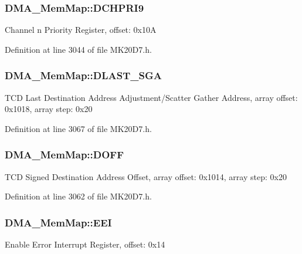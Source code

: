 \subsubsection[{\texorpdfstring{D\+C\+H\+P\+R\+I9}{DCHPRI9}}]{ D\+M\+A\+\_\+\+Mem\+Map\+::\+D\+C\+H\+P\+R\+I9}\hypertarget{struct_d_m_a___mem_map_a364959f468d1568b369d5a398ad30551}{}\label{struct_d_m_a___mem_map_a364959f468d1568b369d5a398ad30551}
Channel n Priority Register, offset\+: 0x10A 

Definition at line 3044 of file M\+K20\+D7.\+h.

\subsubsection[{\texorpdfstring{D\+L\+A\+S\+T\+\_\+\+S\+GA}{DLAST_SGA}}]{ D\+M\+A\+\_\+\+Mem\+Map\+::\+D\+L\+A\+S\+T\+\_\+\+S\+GA}\hypertarget{struct_d_m_a___mem_map_ace5b1452402cb8cd1863c10b0b8dc8bc}{}\label{struct_d_m_a___mem_map_ace5b1452402cb8cd1863c10b0b8dc8bc}
T\+CD Last Destination Address Adjustment/\+Scatter Gather Address, array offset\+: 0x1018, array step\+: 0x20 

Definition at line 3067 of file M\+K20\+D7.\+h.

\subsubsection[{\texorpdfstring{D\+O\+FF}{DOFF}}]{ D\+M\+A\+\_\+\+Mem\+Map\+::\+D\+O\+FF}\hypertarget{struct_d_m_a___mem_map_a237b710c96aa2c5455df7ae2fc20f1ec}{}\label{struct_d_m_a___mem_map_a237b710c96aa2c5455df7ae2fc20f1ec}
T\+CD Signed Destination Address Offset, array offset\+: 0x1014, array step\+: 0x20 

Definition at line 3062 of file M\+K20\+D7.\+h.

\subsubsection[{\texorpdfstring{E\+EI}{EEI}}]{ D\+M\+A\+\_\+\+Mem\+Map\+::\+E\+EI}\hypertarget{struct_d_m_a___mem_map_af6d4e36800f891e548be42bb47e36aef}{}\label{struct_d_m_a___mem_map_af6d4e36800f891e548be42bb47e36aef}
Enable Error Interrupt Register, offset\+: 0x14 

